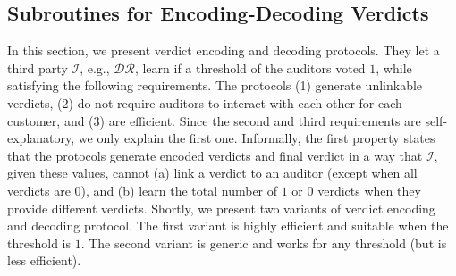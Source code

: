 
\subsection{Subroutines for  Encoding-Decoding Verdicts}\label{sec::Encoding-Decoding-Verdicts}

In this section, we present verdict encoding and decoding protocols. They let a third party $\mathcal{I}$, e.g., $\mathcal{DR}$, learn if a threshold of the auditors voted $1$, while satisfying the following requirements.  The protocols  (1) generate unlinkable verdicts, (2) do not require auditors to interact with each other for each customer, and (3) are efficient. Since the second and third requirements are self-explanatory,  we only explain the first one.  Informally, the first property states that the protocols generate encoded verdicts and final verdict in a way that $\mathcal{I}$,  given these values, cannot (a)   link a  verdict to an auditor (except when all verdicts are $0$), and (b) learn the total number of $1$ or $0$ verdicts when they provide different verdicts.  Shortly, we present two variants of verdict encoding and decoding protocol. The first variant is highly efficient and suitable when the threshold is $1$. The second variant is generic and works for any threshold (but is less efficient). 





